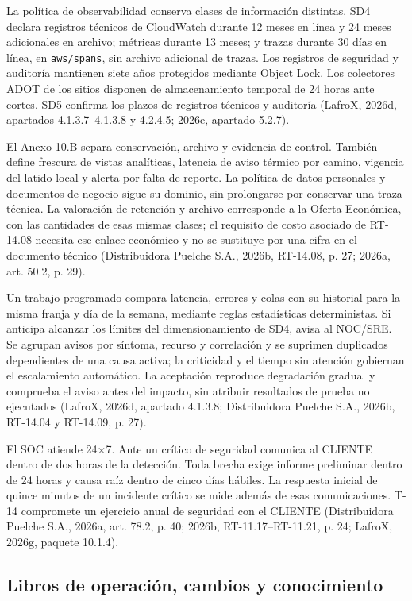 La política de observabilidad conserva clases de información distintas. SD4 declara registros técnicos de CloudWatch durante 12 meses en línea y 24 meses adicionales en archivo; métricas durante 13 meses; y trazas durante 30 días en línea, en \texttt{aws/spans}, sin archivo adicional de trazas. Los registros de seguridad y auditoría mantienen siete años protegidos mediante Object Lock. Los colectores ADOT de los sitios disponen de almacenamiento temporal de 24 horas ante cortes. SD5 confirma los plazos de registros técnicos y auditoría (LafroX, 2026d, apartados 4.1.3.7--4.1.3.8 y 4.2.4.5; 2026e, apartado 5.2.7).

El Anexo 10.B separa conservación, archivo y evidencia de control. También define frescura de vistas analíticas, latencia de aviso térmico por camino, vigencia del latido local y alerta por falta de reporte. La política de datos personales y documentos de negocio sigue su dominio, sin prolongarse por conservar una traza técnica. La valoración de retención y archivo corresponde a la Oferta Económica, con las cantidades de esas mismas clases; el requisito de costo asociado de RT-14.08 necesita ese enlace económico y no se sustituye por una cifra en el documento técnico (Distribuidora Puelche S.A., 2026b, RT-14.08, p. 27; 2026a, art. 50.2, p. 29).

Un trabajo programado compara latencia, errores y colas con su historial para la misma franja y día de la semana, mediante reglas estadísticas deterministas. Si anticipa alcanzar los límites del dimensionamiento de SD4, avisa al NOC/SRE. Se agrupan avisos por síntoma, recurso y correlación y se suprimen duplicados dependientes de una causa activa; la criticidad y el tiempo sin atención gobiernan el escalamiento automático. La aceptación reproduce degradación gradual y comprueba el aviso antes del impacto, sin atribuir resultados de prueba no ejecutados (LafroX, 2026d, apartado 4.1.3.8; Distribuidora Puelche S.A., 2026b, RT-14.04 y RT-14.09, p. 27).

El SOC atiende 24$\times$7. Ante un crítico de seguridad comunica al CLIENTE dentro de dos horas de la detección. Toda brecha exige informe preliminar dentro de 24 horas y causa raíz dentro de cinco días hábiles. La respuesta inicial de quince minutos de un incidente crítico se mide además de esas comunicaciones. T-14 compromete un ejercicio anual de seguridad con el CLIENTE (Distribuidora Puelche S.A., 2026a, art. 78.2, p. 40; 2026b, RT-11.17--RT-11.21, p. 24; LafroX, 2026g, paquete 10.1.4).

\subsection{Libros de operación, cambios y conocimiento}
\label{sub:sd10-procedimientos}

